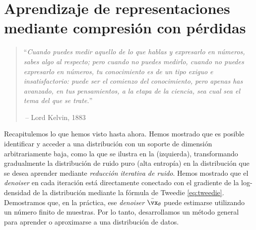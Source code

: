 \documentclass[../../book-main.tex]{subfiles}
\begin{document}
\chapter{Aprendizaje de representaciones mediante compresión con pérdidas}
\label{ch:lossy-compression}



\begin{quote}
    ``{\em Cuando puedes medir aquello de lo que hablas
    y expresarlo en números, sabes algo
    al respecto; pero cuando no puedes medirlo, cuando
    no puedes expresarlo en números, tu conocimiento es
    de un tipo exiguo e insatisfactorio: puede ser el
    comienzo del conocimiento, pero apenas has avanzado, en tus
    pensamientos, a la etapa de la ciencia, sea cual sea
    el tema del que se trate.}''

    $~$\hfill -- Lord Kelvin, 1883
\end{quote}
\vspace{5mm}

Recapitulemos lo que hemos visto hasta ahora. Hemos mostrado que es
posible identificar y acceder a una distribución con un soporte de
dimensión arbitrariamente baja, como la que se ilustra en la
 (izquierda), transformando gradualmente
la distribución de ruido puro (alta entropía) en la distribución que 
se desea aprender mediante \textit{reducción iterativa de ruido}. Hemos
mostrado que el \textit{denoiser} en cada iteración está directamente conectado con
el gradiente de la log-densidad de la distribución mediante la fórmula de Tweedie
\eqref{eq:tweedie}. Demostramos que, en la práctica, ese \textit{denoiser} 
\(\bar{\vx}_{\theta}\) puede estimarse utilizando un número finito de muestras. Por lo tanto,
desarrollamos un método general para aprender o aproximarse a una distribución de datos.
\end{document}

